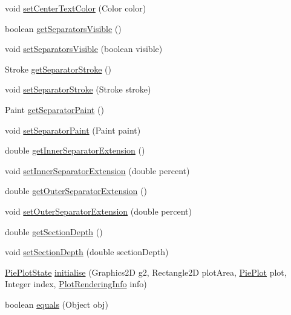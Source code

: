 \begin{DoxyCompactItemize}
void \mbox{\hyperlink{classorg_1_1jfree_1_1chart_1_1plot_1_1_ring_plot_a018ee9ac15d081db0ac018d01cb744c8}{set\+Center\+Text\+Color}} (Color color)
\item 
boolean \mbox{\hyperlink{classorg_1_1jfree_1_1chart_1_1plot_1_1_ring_plot_a759cfedb67a89fb268c0c1b77f6952d1}{get\+Separators\+Visible}} ()
\item 
void \mbox{\hyperlink{classorg_1_1jfree_1_1chart_1_1plot_1_1_ring_plot_a9b60ddf9d8fc13eed9352ed8da3178e6}{set\+Separators\+Visible}} (boolean visible)
\item 
Stroke \mbox{\hyperlink{classorg_1_1jfree_1_1chart_1_1plot_1_1_ring_plot_a1282d5d06eadea106d5ce3b25cc5010e}{get\+Separator\+Stroke}} ()
\item 
void \mbox{\hyperlink{classorg_1_1jfree_1_1chart_1_1plot_1_1_ring_plot_a2a7c5abc0cbdd3919ed689af86617749}{set\+Separator\+Stroke}} (Stroke stroke)
\item 
Paint \mbox{\hyperlink{classorg_1_1jfree_1_1chart_1_1plot_1_1_ring_plot_af26d61ff0ae77fc675f288a3a10102b1}{get\+Separator\+Paint}} ()
\item 
void \mbox{\hyperlink{classorg_1_1jfree_1_1chart_1_1plot_1_1_ring_plot_ab84ed901a672a1986208fac5eea4d124}{set\+Separator\+Paint}} (Paint paint)
\item 
double \mbox{\hyperlink{classorg_1_1jfree_1_1chart_1_1plot_1_1_ring_plot_af94bba1ac45b66d27c45ba268e0c63ee}{get\+Inner\+Separator\+Extension}} ()
\item 
void \mbox{\hyperlink{classorg_1_1jfree_1_1chart_1_1plot_1_1_ring_plot_ad2e08a53e400d8fed0d516222276db69}{set\+Inner\+Separator\+Extension}} (double percent)
\item 
double \mbox{\hyperlink{classorg_1_1jfree_1_1chart_1_1plot_1_1_ring_plot_a98c30bad9e360b42056a9614fa04de17}{get\+Outer\+Separator\+Extension}} ()
\item 
void \mbox{\hyperlink{classorg_1_1jfree_1_1chart_1_1plot_1_1_ring_plot_a72407832e42e6e9d804301a68e2c269e}{set\+Outer\+Separator\+Extension}} (double percent)
\item 
double \mbox{\hyperlink{classorg_1_1jfree_1_1chart_1_1plot_1_1_ring_plot_a5046fadad2c358a4759e81a3aa8b1830}{get\+Section\+Depth}} ()
\item 
void \mbox{\hyperlink{classorg_1_1jfree_1_1chart_1_1plot_1_1_ring_plot_a067bff0789b2865b27801dd7e22befd8}{set\+Section\+Depth}} (double section\+Depth)
\item 
\mbox{\hyperlink{classorg_1_1jfree_1_1chart_1_1plot_1_1_pie_plot_state}{Pie\+Plot\+State}} \mbox{\hyperlink{classorg_1_1jfree_1_1chart_1_1plot_1_1_ring_plot_a4a4994c3d2497203b0b67a1885e5a689}{initialise}} (Graphics2D g2, Rectangle2D plot\+Area, \mbox{\hyperlink{classorg_1_1jfree_1_1chart_1_1plot_1_1_pie_plot}{Pie\+Plot}} plot, Integer index, \mbox{\hyperlink{classorg_1_1jfree_1_1chart_1_1plot_1_1_plot_rendering_info}{Plot\+Rendering\+Info}} info)
\item 
boolean \mbox{\hyperlink{classorg_1_1jfree_1_1chart_1_1plot_1_1_ring_plot_a7b65a26e04fe9789140d6d68b64f6155}{equals}} (Object obj)
\end{DoxyCompactItemize}
